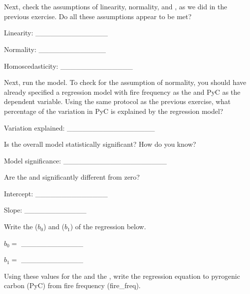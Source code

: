 \documentclass[
  openany]{krantz}
\begin{document}
\begin{verbatim}








\end{verbatim}

Next, check the  assumptions of linearity, normality, and , as we did in the previous exercise.
Do all these assumptions appear to be met?

Linearity: \_\_\_\_\_\_\_\_\_\_\_\_\_\_

Normality: \_\_\_\_\_\_\_\_\_\_\_\_\_

Homoscedasticity: \_\_\_\_\_\_\_\_\_\_\_\_\_\_

Next, run the  model.
To check for the assumption of normality, you should have already specified a regression model with fire frequency as the  and PyC as the dependent variable.
Using the same protocol as the previous exercise, what percentage of the variation in PyC is explained by the regression model?

Variation explained: \_\_\_\_\_\_\_\_\_\_\_\_\_\_\_\_\_

Is the overall model statistically significant?
How do you know?

Model significance: \_\_\_\_\_\_\_\_\_\_\_\_\_\_\_\_\_\_\_\_

Are the  and  significantly different from zero?

Intercept: \_\_\_\_\_\_\_\_\_\_\_\_\_\_

Slope: \_\_\_\_\_\_\_\_\_\_\_\_

\newpage

Write the  (\(b_{0}\)) and  (\(b_{1}\)) of the regression below.

\(b_{0} =\) \_\_\_\_\_\_\_\_\_\_\_\_

\(b_{1} =\) \_\_\_\_\_\_\_\_\_\_\_\_

Using these values for the  and the , write the regression equation to  pyrogenic carbon (PyC) from fire frequency (fire\_freq).

\begin{verbatim}

\end{verbatim}
\end{document}
